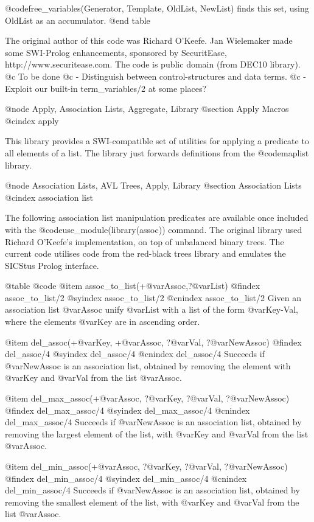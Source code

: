 {{{{{{{{{    @code{free_variables(Generator, Template, OldList, NewList)} finds this set, using OldList as an accumulator.
@end table

The original author of this code was Richard O'Keefe. Jan Wielemaker
    made some SWI-Prolog enhancements, sponsored by SecuritEase,
    http://www.securitease.com. The code is public domain (from DEC10 library).
    @c To be done
    @c     - Distinguish between control-structures and data terms.
    @c     - Exploit our built-in term_variables/2 at some places? 



@node Apply, Association Lists, Aggregate, Library
@section Apply Macros
@cindex apply

This library provides a SWI-compatible set of utilities for applying a
predicate to all elements of a list. The library just forwards
definitions from the @code{maplist} library.



@node Association Lists, AVL Trees, Apply, Library
@section Association Lists
@cindex association list

The following association list manipulation predicates are available
once included with the @code{use_module(library(assoc))} command. The
original library used Richard O'Keefe's implementation, on top of
unbalanced binary trees. The current code utilises code from the
red-black trees library and emulates the SICStus Prolog interface.

@table @code
@item assoc_to_list(+@var{Assoc},?@var{List})
@findex assoc_to_list/2
@syindex assoc_to_list/2
@cnindex assoc_to_list/2
Given an association list @var{Assoc} unify @var{List} with a list of
the form @var{Key-Val}, where the elements @var{Key} are in ascending
order.

@item del_assoc(+@var{Key}, +@var{Assoc}, ?@var{Val}, ?@var{NewAssoc})
@findex del_assoc/4
@syindex del_assoc/4
@cnindex del_assoc/4
Succeeds if @var{NewAssoc} is an association list, obtained by removing
the element with @var{Key} and @var{Val} from the list @var{Assoc}.

@item del_max_assoc(+@var{Assoc}, ?@var{Key}, ?@var{Val}, ?@var{NewAssoc})
@findex del_max_assoc/4
@syindex del_max_assoc/4
@cnindex del_max_assoc/4
Succeeds if @var{NewAssoc} is an association list, obtained by removing
the largest element of the list, with @var{Key} and @var{Val} from the
list @var{Assoc}.

@item del_min_assoc(+@var{Assoc}, ?@var{Key}, ?@var{Val}, ?@var{NewAssoc})
@findex del_min_assoc/4
@syindex del_min_assoc/4
@cnindex del_min_assoc/4
Succeeds if @var{NewAssoc} is an association list, obtained by removing
the smallest element of the list, with @var{Key} and @var{Val}
from the list @var{Assoc}.

}}}}}}}}}
